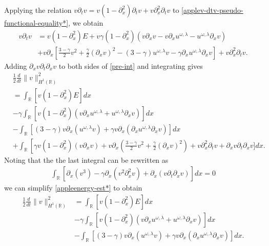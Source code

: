 \documentclass[12pt,reqno]{amsart}
\newcommand{\rr}{\mathbb{R}}
\newcommand{\p}{\partial}
\theoremstyle{plain}  %
\theoremstyle{definition}
\begin{document}
	Applying the relation $v\p_t v = v(1-\p_x^2) \p_t v + v\p_x^2 \p_t v$ to
	\eqref{applev-dtv-pseudo-functional-equality*}, we obtain
	\begin{equation}
		\label{pre-int}
		\begin{split}
		v \p_t v &= v(1- \p_x^2)E + v\gamma(1- \p_x^2)(v\p_x v - v\p_x u^{\omega,\lambda} -
			u^{\omega,\lambda} \p_x v)
			\\
			&+ v\p_x \left[ \frac{3-\gamma}{2}v^2 + \frac{\gamma}{2}(\p_x v)^2 -
			(3-\gamma)u^{\omega,\lambda} v - \gamma \p_x u^{\omega,\lambda} \p_x v
			\right] + v\p_x^2 \p_t v.
		\end{split}
	\end{equation}
	Adding $\p_x v \p_t \p_x v$ to both sides of \eqref{pre-int} and 
	integrating gives
	\begin{equation}
		\label{appleenergy-est*}
		\begin{split}
			&\frac{1}{2} \frac{d}{dt} \|v\|_{H^1(\rr)}^2  
			\\
		& =  \int_{\rr} \left[ v(1-\p_x^2)E \right]dx
		\\
		& - \gamma \int_{\rr} \left[ v(1-\p_x^2)(v\p_x u^{\omega,\lambda} + u^{\omega,\lambda} \p_x v) \right]dx
		\\
		&- \int_{\rr}\left[ \left( 3-\gamma \right)v \p_x\left( u^{\omega,\lambda}v \right) + \gamma v
		\p_x \left( \p_x u^{\omega,\lambda} \p_x v \right)\right]dx
		\\
		&+  \int_{\rr}
		\left[ \gamma v \left( 1-\p_x^2 \right)\left( v \p_x v \right) + v
		\p_x \left( \frac{3-\gamma}{2} v^2 + \frac{\gamma}{2}\left( \p_x v \right)^2
		\right) \right . +  v \p_x^2 \p_t v + \p_x v \p_t \p_x v\bigg]dx.
	\end{split}
\end{equation}
Noting that the the last integral can be rewritten as 
\begin{equation*}
	\begin{split}
	\int_{\rr} \left[ \p_x (v^3) - \gamma \p_x (v^2 \p_x^2 v) + \p_x\left( v \p_t
	\p_x v
	\right) \right]dx  = 0
\end{split}
\end{equation*}
%
we can simplify \eqref{appleenergy-est*} to obtain
%
%
\begin{equation}
\label{appleenergy-est}
\begin{split}
\frac{1}{2} \frac{d}{dt} \|v\|_{H^1(\rr)}^2  
& = 
 \int_{\rr} \left[ v(1-\p_x^2)E \right]dx\\
 &-
 \gamma \int_{\rr} \left[ v(1-\p_x^2)(v\p_x u^{\omega,\lambda} + 
u^{\omega,\lambda} \p_x v) \right]dx
\\
&- \int_{\rr}\left[ \left( 3-\gamma \right)v \p_x\left( u^{\omega,\lambda}v 
\right) + \gamma v
\p_x \left( \p_x u^{\omega,\lambda} \p_x v \right)\right]dx.
\end{split}
\end{equation}
\end{document}

